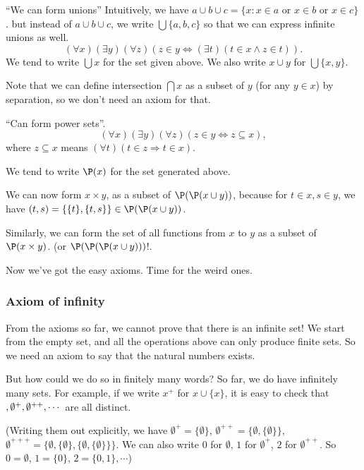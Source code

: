 \documentclass[a4paper]{article}
\begin{document}
\begin{axiom}
  ``We can form unions'' Intuitively, we have $a\cup b\cup c = \{x: x\in a \text{ or }x\in b\text{ or }x\in c\}$. but instead of $a\cup b\cup c$, we write $\bigcup\{a, b, c\}$ so that we can express infinite unions as well.
  \[
    (\forall x)(\exists y)(\forall z)(z\in y \Leftrightarrow (\exists t)(t\in x \wedge z\in t)).
  \]
  We tend to write $\bigcup x$ for the set given above. We also write $x\cup y$ for $\bigcup\{x, y\}$.
\end{axiom}

Note that we can define intersection $\bigcap x$ as a subset of $y$ (for any $y\in x$) by separation, so we don't need an axiom for that.
\begin{axiom}
  ``Can form power sets''.
  \[
    (\forall x)(\exists y)(\forall z)(z\in y \Leftrightarrow z\subseteq x),
  \]
  where $z\subseteq x$ means $(\forall t)(t\in z \Rightarrow t\in x)$.

  We tend to write $\P(x)$ for the set generated above.
\end{axiom}
We can now form $x\times y$, as a subset of $\P(\P(x\cup y))$, because for $t\in x, s\in y$, we have $(t, s) = \{\{t\},\{t, s\}\}\in \P(\P(x\cup y))$.

Similarly, we can form the set of all functions from $x$ to $y$ as a subset of $\P(x\times y)$. (or $\P(\P(\P(x\cup y)))$!.

Now we've got the easy axioms. Time for the weird ones.

\subsubsection*{Axiom of infinity}
From the axioms so far, we cannot prove that there is an infinite set! We start from the empty set, and all the operations above can only produce finite sets. So we need an axiom to say that the natural numbers exists.

But how could we do so in finitely many words? So far, we do have infinitely many sets. For example, if we write $x^+$ for $x\cup \{x\}$, it is easy to check that $\empty, \emptyset^+, \emptyset^{++}, \cdots$ are all distinct.

(Writing them out explicitly, we have $\emptyset^+ = \{\emptyset\}$, $\emptyset^{++} = \{\emptyset, \{\emptyset\}\}$, $\emptyset^{+++} = \{\emptyset, \{\emptyset\}, \{\emptyset, \{\emptyset\}\}\}$. We can also write $0$ for $\emptyset$, $1$ for $\emptyset^{+}$, $2$ for $\emptyset^{++}$. So $0 = \emptyset$, $1 = \{0\}$, $2 = \{0, 1\}, \cdots$)
\end{document}
